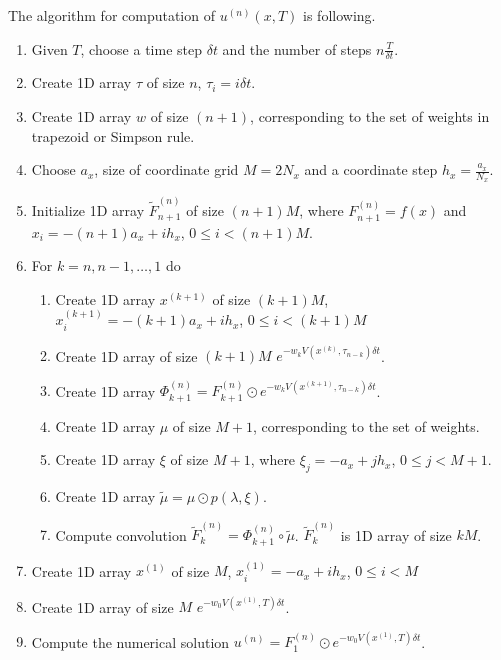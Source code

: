 \documentclass[11pt,a4paper]{extarticle}
\begin{document}
The algorithm for computation of $u^{(n)}(x, T)$ is following.

\begin{enumerate}
    \item Given $T$, choose a time step $\delta t$ and the number of steps $n \frac T{\delta t}$.
    \item Create 1D array $\tau$ of size $n$, $\tau_i = i \delta t$.
    \item Create 1D array $w$ of size $(n+1)$, corresponding to the set of weights in trapezoid or Simpson rule.
    \item Choose $a_x$, size of coordinate grid $M = 2N_x$ and a coordinate step $h_x = \frac{a_x}{N_x}$.
    \item Initialize 1D array $\tilde F_{n+1}^{(n)}$ of size $(n+1)M$, where $F_{n+1}^{(n)} = f(x)$ and $x_i = -(n+1)a_x + ih_x$, $0 \leq i < (n+1)M$.
    \item For $k = n, n-1, \dots, 1$ do
        \begin{enumerate}
        \item Create 1D array $x^{(k+1)}$ of size $(k+1)M$, $x_i^{(k+1)} = -(k+1)a_x + ih_x$, $0 \leq i < (k+1)M$
        \item Create 1D array of size $(k + 1)M$ $e^{-w_k V(x^{(k)}, \tau_{n-k}) \delta t}$.
        \item Create 1D array $\Phi_{k+1}^{(n)} = F_{k+1}^{(n)} \odot e^{-w_k V(x^{(k+1)}, \tau_{n-k}) \delta t}$.
        \item Create 1D array $\mu$ of size $M+1$, corresponding to the set of weights.
        \item Create 1D array $\xi$ of size $M+1$, where $\xi_j = -a_x + jh_x$, $0 \leq j < M+1$.
        \item Create 1D array $\tilde\mu = \mu \odot p(\lambda, \xi)$.
        \item Compute convolution $\tilde F_k^{(n)} = \Phi_{k+1}^{(n)} \circ \tilde\mu$. $\tilde F_k^{(n)}$ is 1D array of size $kM$.
        \end{enumerate}
    \item Create 1D array $x^{(1)}$ of size $M$, $x_i^{(1)} = -a_x + ih_x$, $0 \leq i < M$
    \item Create 1D array of size $M$ $e^{-w_0 V(x^{(1)}, T) \delta t}$.
    \item Compute the numerical solution $u^{(n)} = F_1^{(n)} \odot e^{-w_0 V(x^{(1)}, T) \delta t}$.
         
\end{enumerate}
\end{document}
